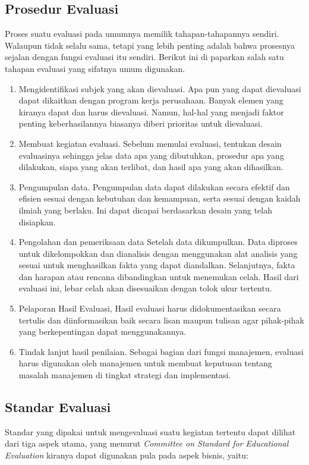 \subsection{Prosedur Evaluasi}
Proses suatu evaluasi pada umumnya memilik tahapan-tahapannya sendiri. Walaupun tidak selalu sama, tetapi yang lebih penting adalah bahwa prosesnya sejalan dengan fungsi evaluasi itu sendiri. Berikut ini di paparkan salah satu tahapan evaluasi yang sifatnya umum digunakan. 

\begin{enumerate}
	\item Mengidentifikasi subjek yang akan dievaluasi. Apa pun yang dapat dievaluasi dapat dikaitkan dengan program kerja perusahaan. Banyak elemen yang kiranya dapat dan harus dievaluasi. Namun, hal-hal yang menjadi faktor penting keberhasilannya biasanya diberi prioritas untuk dievaluasi.
	\item Membuat kegiatan evaluasi. Sebelum memulai evaluasi, tentukan desain evaluasinya sehingga jelas data apa yang dibutuhkan, prosedur apa yang dilakukan, siapa yang akan terlibat, dan hasil apa yang akan dihasilkan.
	\item Pengumpulan data. Pengumpulan data dapat dilakukan secara efektif dan efisien sesuai dengan kebutuhan dan kemampuan, serta sesuai dengan kaidah ilmiah yang berlaku. Ini dapat dicapai berdasarkan desain yang telah disiapkan.
	\item Pengolahan dan pemeriksaan data Setelah data dikumpulkan. Data diproses untuk dikelompokkan dan dianalisis dengan menggunakan alat analisis yang sesuai untuk menghasilkan fakta yang dapat diandalkan. Selanjutnya, fakta dan harapan atau rencana dibandingkan untuk menemukan celah. Hasil dari evaluasi ini, lebar celah akan disesuaikan dengan tolok ukur tertentu.
	\item Pelaporan Hasil Evaluasi, Hasil evaluasi harus didokumentasikan secara tertulis dan diinformasikan baik secara lisan maupun tulisan agar pihak-pihak yang berkepentingan dapat menggunakannya.
	\item Tindak lanjut hasil penilaian. Sebagai bagian dari fungsi manajemen, evaluasi harus digunakan oleh manajemen untuk membuat keputusan tentang masalah manajemen di tingkat strategi dan implementasi.
\end{enumerate}

\subsection{Standar Evaluasi}
Standar yang dipakai untuk mengevaluasi suatu kegiatan tertentu dapat dilihat dari tiga aspek utama, yang menurut \textit{Committee on Standard for Educational Evaluation} kiranya dapat digunakan pula pada aspek bisnis, yaitu: 

